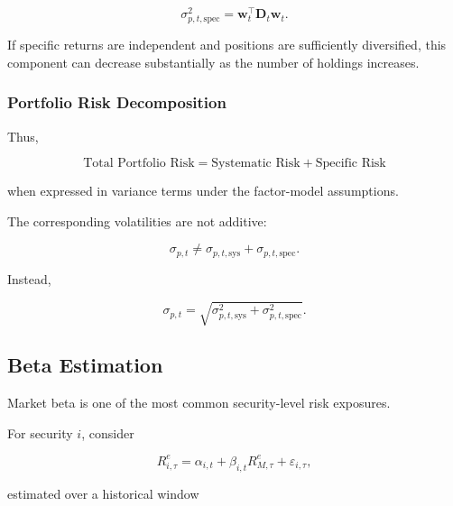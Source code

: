 \documentclass[11pt,a4paper]{article}
\begin{document}
\begin{equation}
\boxed{
\sigma_{p,t,\mathrm{spec}}^{2}
=
\mathbf{w}_t^\top
\mathbf{D}_t
\mathbf{w}_t.
}
\end{equation}

If specific returns are independent and positions are sufficiently
diversified, this component can decrease substantially as the number of
holdings increases.


\subsubsection{Portfolio Risk Decomposition}

Thus,

\begin{equation}
\boxed{
\text{Total Portfolio Risk}
=
\text{Systematic Risk}
+
\text{Specific Risk}
}
\end{equation}

when expressed in variance terms under the factor-model assumptions.

The corresponding volatilities are not additive:

\begin{equation}
\sigma_{p,t}
\neq
\sigma_{p,t,\mathrm{sys}}
+
\sigma_{p,t,\mathrm{spec}}.
\end{equation}

Instead,

\begin{equation}
\boxed{
\sigma_{p,t}
=
\sqrt{
\sigma_{p,t,\mathrm{sys}}^{2}
+
\sigma_{p,t,\mathrm{spec}}^{2}
}.
}
\end{equation}


\subsection{Beta Estimation}
\label{subsec:portfolio_beta_estimation}

Market beta is one of the most common security-level risk exposures.

For security $i$, consider

\begin{equation}
\boxed{
R_{i,\tau}^{e}
=
\alpha_{i,t}
+
\beta_{i,t}
R_{M,\tau}^{e}
+
\varepsilon_{i,\tau},
}
\end{equation}

estimated over a historical window
\end{document}
